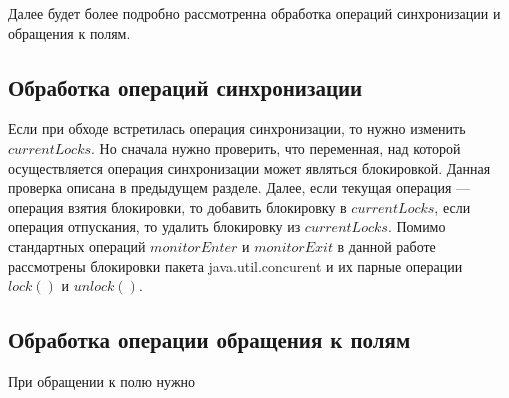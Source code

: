 \FloatBarrier

Далее будет более подробно рассмотренна обработка операций синхронизации и обращения к полям.

\subsection{Обработка операций синхронизации}
Если при обходе встретилась операция синхронизации, то нужно изменить $currentLocks$. Но сначала нужно проверить, что переменная, над которой осуществляется операция синхронизации может являться блокировкой. Данная проверка описана в предыдущем разделе. Далее, если текущая операция --- операция взятия блокировки, то добавить блокировку в $currentLocks$, 
если операция отпускания, то удалить блокировку из $currentLocks$. Помимо стандартных операций $monitorEnter$ и $monitorExit$ в данной работе рассмотрены блокировки пакета java.util.concurent и их парные операции $lock()$ и $unlock()$.

\subsection{Обработка операции обращения к полям}
При обращении к полю нужно 


\FloatBarrier
